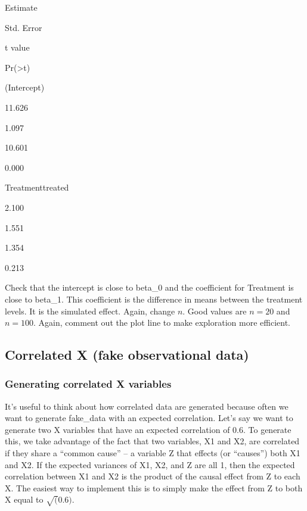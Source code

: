 \documentclass[]{book}
\begin{document}
Estimate

Std. Error

t value

Pr(\textgreater{}\textbar{}t\textbar{})

(Intercept)

11.626

1.097

10.601

0.000

Treatmenttreated

2.100

1.551

1.354

0.213

Check that the intercept is close to beta\_0 and the coefficient for
Treatment is close to beta\_1. This coefficient is the difference in
means between the treatment levels. It is the simulated effect. Again,
change \(n\). Good values are \(n=20\) and \(n=100\). Again, comment out
the plot line to make exploration more efficient.

\subsection{Correlated X (fake observational
data)}\label{correlated-x-fake-observational-data}

\subsubsection{Generating correlated X
variables}\label{generating-correlated-x-variables}

It's useful to think about how correlated data are generated because
often we want to generate fake\_data with an expected correlation. Let's
say we want to generate two X variables that have an expected
correlation of 0.6. To generate this, we take advantage of the fact that
two variables, X1 and X2, are correlated if they share a ``common
cause'' -- a variable Z that effects (or ``causes'') both X1 and X2. If
the expected variances of X1, X2, and Z are all 1, then the expected
correlation between X1 and X2 is the product of the causal effect from Z
to each X. The easiest way to implement this is to simply make the
effect from Z to both X equal to \(\sqrt(0.6)\).
\end{document}
